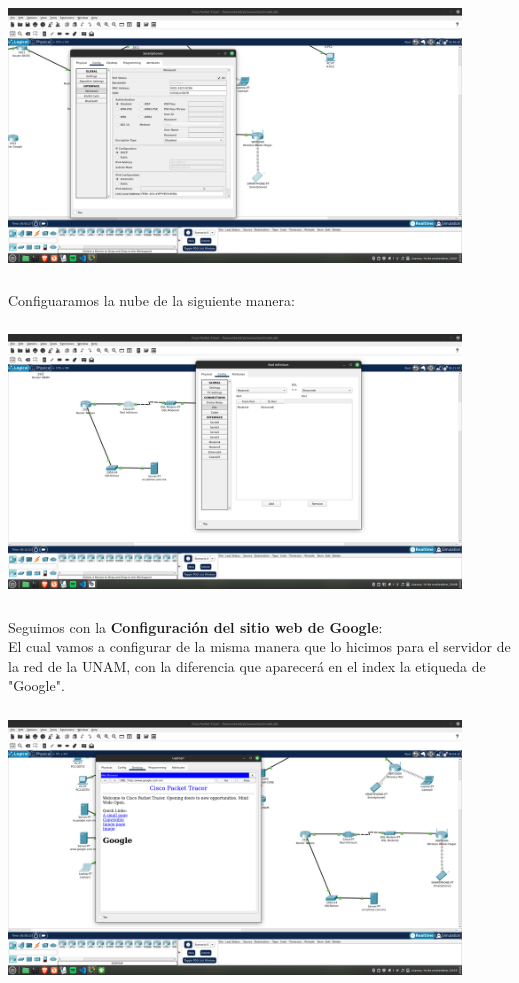 \documentclass[14pt]{book}
\begin{document}
\includegraphics[width=12cm, height=8cm]{images/cel a red.png}\\

Configuaramos la nube de la siguiente manera:\\

\includegraphics[width=12cm, height=8cm]{images/conf de cloud.png}\\

Seguimos con la \textbf{Configuración del sitio web de Google}:\\

El cual vamos a configurar de la misma manera que lo hicimos para el servidor de la red de la UNAM, con la diferencia que aparecerá en el index la etiqueda de "Google".\\

\includegraphics[width=12cm, height=8cm]{images/buscador de lab.png}\\
\end{document}
